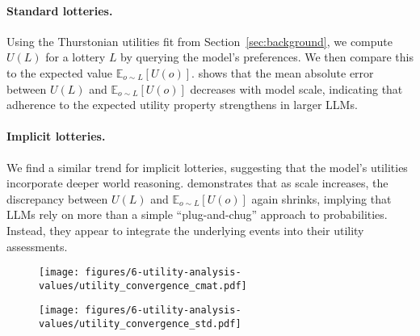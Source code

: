 \paragraph{Standard lotteries.}
Using the Thurstonian utilities fit from Section~\ref{sec:background}, we compute \(U(L)\) for a lottery \(L\) by querying the model’s preferences. We then compare this to the expected value \(\mathbb{E}_{o\sim L}[U(o)]\).  shows that the mean absolute error between \(U(L)\) and \(\mathbb{E}_{o\sim L}[U(o)]\) decreases with model scale, indicating that adherence to the expected utility property strengthens in larger LLMs.

\paragraph{Implicit lotteries.}
We find a similar trend for implicit lotteries, suggesting that the model’s utilities incorporate deeper world reasoning.  demonstrates that as scale increases, the discrepancy between \(U(L)\) and \(\mathbb{E}_{o\sim L}[U(o)]\) again shrinks, implying that LLMs rely on more than a simple ``plug-and-chug'' approach to probabilities. Instead, they appear to integrate the underlying events into their utility assessments.






\begin{figure}[t]
    \vspace{-10pt}
    \centering
    \begin{minipage}[t]{0.49\textwidth}
        \centering
        \texttt{[image: figures/6-utility-analysis-values/utility\_convergence\_cmat.pdf]}
        \label{fig:utility_convergence_cmat}
    \end{minipage}\hfill
    \begin{minipage}[t]{0.49\textwidth}
        \centering
        \texttt{[image: figures/6-utility-analysis-values/utility\_convergence\_std.pdf]}
        \label{fig:utility_convergence_std}
    \end{minipage}
    \vspace{-10pt}
\end{figure}





